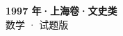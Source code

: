 \documentclass[zihao=-4, a4paper]{ctexart}
\begin{document}
\begin{center}
  {\Large\bfseries 1997 年·上海卷·文史类}\\[4pt]
  {\large 数学 · 试题版}
\end{center}
\medskip
{}

\end{document}
